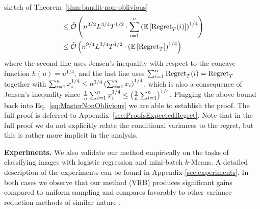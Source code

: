 \begin{proofarg}{sketch of Theorem~\ref{thm:bandit-non-oblivious}}
\begin{align*}
&\leq 
\tilde{\mathcal{O}} \left(   n^{3/2}L^{3/4}T^{1/2} \cdot
\sum_{i=1}^n 
\left( \mathbb{E}\left[ \text{Regret}_T(i)  \right]\right)^{1/4}
 \right)\\
 &\leq 
\tilde{\mathcal{O}} \left(  n^{9/4}L^{3/4}T^{1/2} \cdot
\left( \mathbb{E}\left[  \text{Regret}_T \right]  \right)^{1/4}
 \right)
\end{align*}
where the second line uses Jensen's inequality with respect to the concave function $h(u) = u^{1/4}$, and the last line uses $\sum_{i=1}^n \text{Regret}_T(i) = \text{Regret}_T$ together with $\sum_{i=1}^n x_i^{1/4} \leq n^{3/4}\left(\sum_{i=1}^n x_i\right)^{1/4}$, which is also a consequence of Jensen's inequality since 
$\frac{1}{n}\sum_{i=1}^n x_i^{1/4}\leq \left(\frac{1}{n}\sum_{i=1}^n\right)^{1/4}$. 
Plugging the above bound back into Eq.~\eqref{eq:MasterNonOblivious} we are able to establish the proof. The full proof is deferred to Appendix~\ref{sec:ProofsExpectedRegret}.
Note that in the full proof we do not explicitly relate the conditional variances to the regret, but this is rather more implicit in the analysis.
\end{proofarg}

\textbf{Experiments.} We also validate our method empirically on the tasks of classifying images with logistic regression and mini-batch $k$-Means. A detailed description of the experiments can be found in Appendix \ref{sec:experiments}. In both cases we observe that our method (VRB) produces significant gains compared to uniform sampling and compares favorably to other variance reduction methods of similar nature \citep{salehi2017,pmlr-v70-namkoong17a}.

